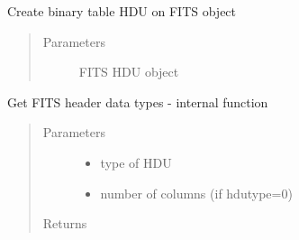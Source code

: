 \documentclass[letterpaper,10pt,english]{sphinxmanual}
\begin{document}

\begin{fulllineitems}
\label{\detokenize{qfits_functions:qfits.fitsptab}}
Create binary table HDU on FITS object
\begin{quote}\begin{description}
\item[{Parameters}] \leavevmode
{} \textendash{} FITS HDU object

\end{description}\end{quote}

\end{fulllineitems}


\begin{fulllineitems}
\label{\detokenize{qfits_functions:qfits.fitstypes}}
Get FITS header data types - internal function
\begin{quote}\begin{description}
\item[{Parameters}] \leavevmode\begin{itemize}
\item {} 
 \textendash{} type of HDU

\item {} 
 \textendash{} number of columns (if hdutype=0)

\end{itemize}

\item[{Returns}] \leavevmode



\end{description}\end{quote}

\end{fulllineitems}
\end{document}
